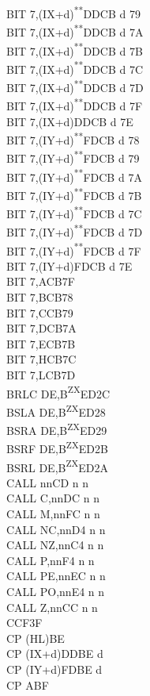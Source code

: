 \documentclass[12pt,twoside,openright,a4paper]{book}
\newcommand{\UNDOC}{\textnormal{\textsuperscript{**}}}
\newcommand{\ZXN}{\textnormal{\textsuperscript{ZX}}}
\begin{document}
\begin{multicols}{3}
{\begin{tabbing}
	BIT 7,(IX+d)\UNDOC\>DDCB d 79\\
	BIT 7,(IX+d)\UNDOC\>DDCB d 7A\\
	BIT 7,(IX+d)\UNDOC\>DDCB d 7B\\
	BIT 7,(IX+d)\UNDOC\>DDCB d 7C\\
	BIT 7,(IX+d)\UNDOC\>DDCB d 7D\\
	BIT 7,(IX+d)\UNDOC\>DDCB d 7F\\
	BIT 7,(IX+d)\>DDCB d 7E\\
	BIT 7,(IY+d)\UNDOC\>FDCB d 78\\
	BIT 7,(IY+d)\UNDOC\>FDCB d 79\\
	BIT 7,(IY+d)\UNDOC\>FDCB d 7A\\
	BIT 7,(IY+d)\UNDOC\>FDCB d 7B\\
	BIT 7,(IY+d)\UNDOC\>FDCB d 7C\\
	BIT 7,(IY+d)\UNDOC\>FDCB d 7D\\
	BIT 7,(IY+d)\UNDOC\>FDCB d 7F\\
	BIT 7,(IY+d)\>FDCB d 7E\\
	BIT 7,A\>CB7F\\
	BIT 7,B\>CB78\\
	BIT 7,C\>CB79\\
	BIT 7,D\>CB7A\\
	BIT 7,E\>CB7B\\
	BIT 7,H\>CB7C\\
	BIT 7,L\>CB7D\\
	BRLC DE,B\ZXN\>ED2C\\
	BSLA DE,B\ZXN\>ED28\\
	BSRA DE,B\ZXN\>ED29\\
	BSRF DE,B\ZXN\>ED2B\\
	BSRL DE,B\ZXN\>ED2A\\
	CALL nn\>CD n n\\
	CALL C,nn\>DC n n\\
	CALL M,nn\>FC n n\\
	CALL NC,nn\>D4 n n\\
	CALL NZ,nn\>C4 n n\\
	CALL P,nn\>F4 n n\\
	CALL PE,nn\>EC n n\\
	CALL PO,nn\>E4 n n\\
	CALL Z,nn\>CC n n\\
	CCF\>3F\\
	CP (HL)\>BE\\
	CP (IX+d)\>DDBE d\\
	CP (IY+d)\>FDBE d\\
	CP A\>BF\\

\end{tabbing}}
\end{multicols}
\end{document}
